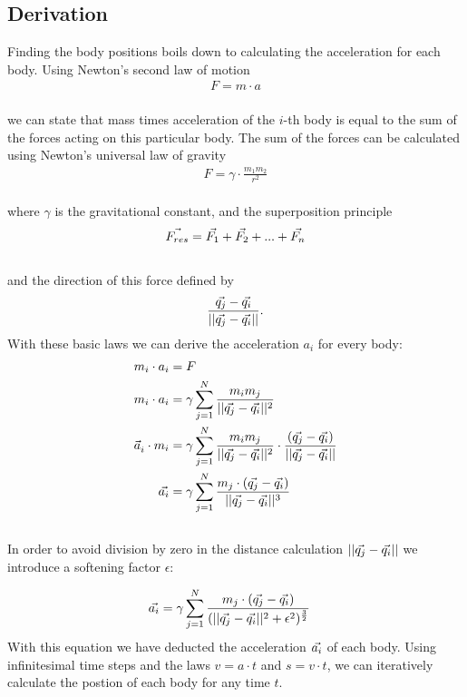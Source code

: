 \documentclass[a4paper,11pt]{scrartcl} %
\newcommand*{\vv}[1]{\vec{\mkern0mu#1}}
\begin{document}
\subsection{Derivation}
Finding the body positions boils down to calculating the acceleration for each body. Using Newton's second law of motion
\begin{align*}
F = m \cdot a
\end{align*}\\
we can state that mass times acceleration of the $i$-th body is equal to the sum of the forces acting on this particular body. The sum of the forces can be calculated using Newton's universal law of gravity
\begin{align*}
F = \gamma \cdot \frac{m_1m_2}{r^2}
\end{align*}\\
where $\gamma$ is the gravitational constant, and the superposition principle
\begin{align*}
\vv{F_{res}} = \vv{F_1} + \vv{F_2} + ... + \vv{F_n}
\end{align*}\\
and the direction of this force defined by
\begin{align*}
\frac{\vv{q_j} -\vv{q_i}}{||\vv{q_j} - \vv{q_i}||}.
\end{align*}
With these basic laws we can derive the acceleration $a_i$ for every body:
\begin{align*}
	m_i \cdot a_i &= F\\
	m_i \cdot a_i &= \gamma \sum\limits_{j=1}^N \frac{m_i m_j}{||\vv{q_j} - \vv{q_i}||^2}  \\
	\vec{a}^{\,}_i \cdot m_i &= \gamma \sum\limits_{j=1}^N \frac{m_i m_j}{||\vv{q_j} - \vv{q_i}||^2} \cdot \frac{(\vv{q_j} - \vv{q_i})}{||\vv{q_j} - \vv{q_i}||} \\
	\vv{a_i} &= \gamma \sum\limits_{j=1}^N \frac{m_j \cdot (\vv{q_j} - \vv{q_i})}{||\vv{q_j} - \vv{q_i}||^3}
\end{align*}\\
In order to avoid division by zero in the distance calculation $||\vv{q_j} - \vv{q_i}||$ we introduce a softening factor $\epsilon$:

\begin{align*}
	\vv{a_i} &= \gamma \sum\limits_{j=1}^N \frac{m_j \cdot (\vv{q_j} - \vv{q_i})}{(||\vv{q_j} - \vv{q_i}||^2 + \epsilon^2)^\frac{3}{2}}
\end{align*}
With this equation we have deducted the acceleration $\vv{a_i}$ of each body. Using infinitesimal time steps and the laws $v = a\cdot t$ and $s=v\cdot t$, we can iteratively calculate the postion of each body for any time $t$.
\end{document}
